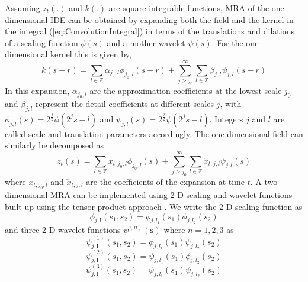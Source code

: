 \documentclass[11pt,draftcls,onecolumn,peerreview]{IEEEtran}
\begin{document}
Assuming $z_t(.)$ and $k(.)$ are square-integrable functions, MRA of the one-dimensional IDE can be obtained by expanding  both the field and the kernel in the integral (\ref{eq:ConvolutionIntegral}) in terms of the translations and dilations of a scaling function $\phi(s)$ and a mother wavelet $\psi(s)$. For the one-dimensional kernel this is given by,
\begin{equation}
 k\left(s-r\right)=\sum_{l \in \mathbb{Z}}\alpha_{j_0,l}\phi_{j_0,l}\left(s-r\right)+\sum_{j\geq j_0}^{\infty} \sum_{l \in \mathbb{Z}}\beta_{j,l}\psi_{j,l}\left(s-r\right) 
\label{eq:KernelExpansion}
\end{equation}
In this expansion, $\alpha_{j_0,l}$ are the approximation coefficients at the lowest scale $j_0$ and $ \beta_{j,l}$ represent the detail coefficients at different scales $j$, with $\phi_{j,l}\left(s\right)=2^{\frac{j}{2}}\phi\left(2^js-l\right) $ and $\psi_{j,l}\left(s\right)=2^{\frac{j}{2}}\psi\left(2^js-l\right)$. Integers $j$ and $l$ are called scale and translation parameters accordingly. The one-dimensional field can similarly be decomposed as
\begin{equation}
 z_t\left(s\right)=\sum_{l \in \mathbb{Z}}x_{t,j_{0},l}\phi_{j_{0},l}\left(s\right)+\sum_{j\geq j_0}^{\infty} \sum_{l \in \mathbb{Z}} \check{x}_{t,j,l}\psi_{j,l}\left(s\right)
\label{eq:FieldExpansion}
\end{equation}
where $ x_{t,j_{0},l}$ and $\check{x}_{t,j,l} $ are the coefficients of the expansion at time $t$.
A  two-dimensional MRA can be implemented using 2-D scaling and wavelet functions built up  using the tensor-product approach \cite{Meyer1992,Mallat1998}. We write the 2-D scaling function as
\begin{equation}
 \phi_{j,\mathbf{l}}\left(s_1,s_2\right)=\phi_{j,l_1}\left(s_1\right)\phi_{j,l_2}\left(s_2\right)
\label{eq:2Dscalingfunction}
\end{equation}
and three 2-D wavelet functions $ \psi^{(n)} \left(\mathbf{s}\right)$ where $n=1,2,3$ as
\begin{equation}
 \psi_{j,\mathbf{l}}^{(1)}\left(s_1,s_2\right)=\phi_{j,l_1}\left(s_1\right)\psi_{j,l_2}\left(s_2\right)
\label{eq:2Dwavelet_1}
\end{equation}
\begin{equation}
 \psi_{j,\mathbf{l}}^{(2)}\left(s_1,s_2\right)=\psi_{j,l_1}\left(s_1\right)\phi_{j,l_2}\left(s_2\right)
\label{eq:2Dwavelet_2}
\end{equation}
\begin{equation}
 \psi_{j,\mathbf{l}}^{(3)}\left(s_1,s_2\right)=\psi_{j,l_1}\left(s_1\right)\psi_{j,l_2}\left(s_2\right)
\label{eq:2Dwavelet_3}
\end{equation}
\end{document}
